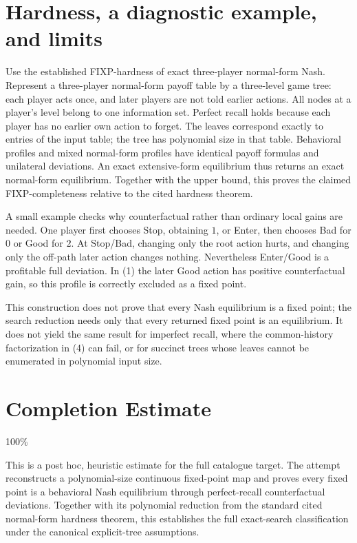 \documentclass[11pt]{article}
\begin{document}
\section*{Hardness, a diagnostic example, and limits}
Use the established FIXP-hardness of exact three-player normal-form Nash.
Represent a three-player normal-form payoff table by a three-level game
tree: each player acts once, and later players are not told earlier
actions. All nodes at a player's level belong to one information set.
Perfect recall holds because each player has no earlier own action to
forget. The leaves correspond exactly to entries of the input table;
the tree has polynomial size in that table. Behavioral profiles and mixed
normal-form profiles have identical payoff formulas and unilateral
deviations. An exact extensive-form equilibrium thus returns an exact
normal-form equilibrium. Together with the upper bound, this proves the
claimed FIXP-completeness relative to the cited hardness theorem.

A small example checks why counterfactual rather than ordinary local
gains are needed. One player first chooses Stop, obtaining $1$, or Enter,
then chooses Bad for $0$ or Good for $2$. At Stop/Bad, changing only the
root action hurts, and changing only the off-path later action changes
nothing. Nevertheless Enter/Good is a profitable full deviation. In (1)
the later Good action has positive counterfactual gain, so this profile
is correctly excluded as a fixed point.

This construction does not prove that every Nash equilibrium is a fixed
point; the search reduction needs only that every returned fixed point
is an equilibrium. It does not yield the same result for imperfect recall,
where the common-history factorization in (4) can fail, or for succinct
trees whose leaves cannot be enumerated in polynomial input size.

\section{Completion Estimate}
100\%

This is a post hoc, heuristic estimate for the full catalogue target.
The attempt reconstructs a polynomial-size continuous fixed-point map and proves every fixed point is a behavioral Nash equilibrium through perfect-recall counterfactual deviations. Together with its polynomial reduction from the standard cited normal-form hardness theorem, this establishes the full exact-search classification under the canonical explicit-tree assumptions.
\end{document}
